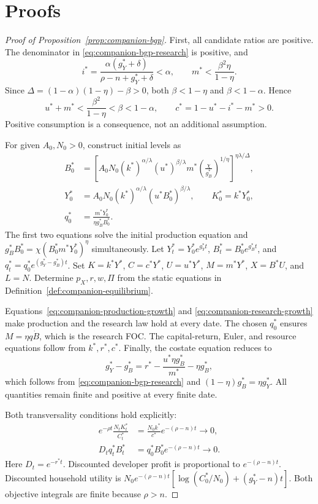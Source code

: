 \section{Proofs}
\label{app:companion-proofs}

\begin{proof}[Proof of Proposition~\ref{prop:companion-bgp}]
First, all candidate ratios are positive. The denominator in
\eqref{eq:companion-bgp-research} is positive, and
\[
 i^*=\frac{\alpha(g_Y^*+\delta)}{\rho-n+g_Y^*+\delta}<\alpha,
 \qquad m^*<\frac{\beta^2\eta}{1-\eta}.
\]
Since $\Delta=(1-\alpha)(1-\eta)-\beta>0$, both
$\beta<1-\eta$ and $\beta<1-\alpha$. Hence
\[
 u^*+m^*<\frac{\beta^2}{1-\eta}<\beta<1-\alpha,
 \qquad c^*=1-u^*-i^*-m^*>0.
\]
Positive consumption is a consequence, not an additional assumption.

For given $A_0,N_0>0$, construct initial levels as
\begin{align}
 B_0^*&=\left[A_0N_0(k^*)^{\alpha/\lambda}(u^*)^{\beta/\lambda}
 m^*\left(\frac{\chi}{g_B^*}\right)^{1/\eta}
 \right]^{\eta\lambda/\Delta},\label{eq:companion-initial-b}\\
 Y_0^*&=A_0N_0(k^*)^{\alpha/\lambda}(u^*B_0^*)^{\beta/\lambda},
 \qquad K_0^*=k^*Y_0^*,\label{eq:companion-initial-y}\\
 q_0^*&=\frac{m^*Y_0^*}{\eta g_B^*B_0^*}.
 \label{eq:companion-initial-q}
\end{align}
The first two equations solve the initial production equation and
$g_B^*B_0^*=\chi(B_0^*m^*Y_0^*)^\eta$ simultaneously.
Let $Y_t^*=Y_0^*e^{g_Y^*t}$, $B_t^*=B_0^*e^{g_B^*t}$, and
$q_t^*=q_0^*e^{(g_Y^*-g_B^*)t}$. Set
$K=k^*Y^*$, $C=c^*Y^*$, $U=u^*Y^*$, $M=m^*Y^*$, $X=B^*U$, and $L=N$.
Determine $p_X,r,w,\Pi$ from the static equations in
Definition~\ref{def:companion-equilibrium}.

Equations~\eqref{eq:companion-production-growth} and
\eqref{eq:companion-research-growth} make production and the research law
hold at every date. The chosen $q_0^*$ ensures $M=\eta q\dot B$, which is
the research FOC. The capital-return, Euler, and resource equations follow
from $k^*,r^*,c^*$. Finally, the costate equation reduces to
\[
 g_Y^*-g_B^*=r^*-\frac{u^*\eta g_B^*}{m^*}-\eta g_B^*,
\]
which follows from \eqref{eq:companion-bgp-research} and
$(1-\eta)g_B^*=\eta g_Y^*$. All quantities remain finite and positive at
every finite date.

Both transversality conditions hold explicitly:
\begin{align}
 e^{-\rho t}\frac{N_tK_t^*}{C_t^*}
 &=\frac{N_0k^*}{c^*}e^{-(\rho-n)t}\longrightarrow0,
 \label{eq:companion-proof-household-tvc}\\
 D_tq_t^*B_t^*&=q_0^*B_0^*e^{-(\rho-n)t}\longrightarrow0.
 \label{eq:companion-proof-developer-tvc}
\end{align}
Here $D_t=e^{-r^*t}$. Discounted developer profit is proportional to
$e^{-(\rho-n)t}$. Discounted household utility is
$N_0e^{-(\rho-n)t}[\log(C_0^*/N_0)+(g_Y^*-n)t]$. Both objective integrals
are finite because $\rho>n$.


\end{proof}
